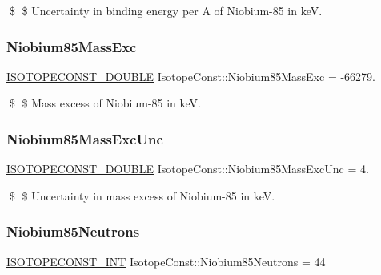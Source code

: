 \$ \$ Uncertainty in binding energy per A of Niobium-\/85 in keV. \mbox{\label{group___isotope_const-_niobium-_nb85_ga5b08a8a03b8d87eed7e7b857cc8b61ff}} 
\subsubsection{\texorpdfstring{Niobium85\+Mass\+Exc}{Niobium85MassExc}}
{\footnotesize\ttfamily \mbox{\hyperlink{group___isotope_const-_macros_ga8f45a7272ce02c0b4c65c44636ed719a}{I\+S\+O\+T\+O\+P\+E\+C\+O\+N\+S\+T\+\_\+\+D\+O\+U\+B\+LE}} Isotope\+Const\+::\+Niobium85\+Mass\+Exc = -\/66279.}

\$ \$ Mass excess of Niobium-\/85 in keV. \mbox{\label{group___isotope_const-_niobium-_nb85_ga4ec47d93d8cc492e999650258195bc5c}} 
\subsubsection{\texorpdfstring{Niobium85\+Mass\+Exc\+Unc}{Niobium85MassExcUnc}}
{\footnotesize\ttfamily \mbox{\hyperlink{group___isotope_const-_macros_ga8f45a7272ce02c0b4c65c44636ed719a}{I\+S\+O\+T\+O\+P\+E\+C\+O\+N\+S\+T\+\_\+\+D\+O\+U\+B\+LE}} Isotope\+Const\+::\+Niobium85\+Mass\+Exc\+Unc = 4.}

\$ \$ Uncertainty in mass excess of Niobium-\/85 in keV. \mbox{\label{group___isotope_const-_niobium-_nb85_ga7127075cfdabb7a713f590aa9651a2ce}} 
\subsubsection{\texorpdfstring{Niobium85\+Neutrons}{Niobium85Neutrons}}
{\footnotesize\ttfamily \mbox{\hyperlink{group___isotope_const-_macros_ga5f18360b3e99483a35c32d789e62621c}{I\+S\+O\+T\+O\+P\+E\+C\+O\+N\+S\+T\+\_\+\+I\+NT}} Isotope\+Const\+::\+Niobium85\+Neutrons = 44}

